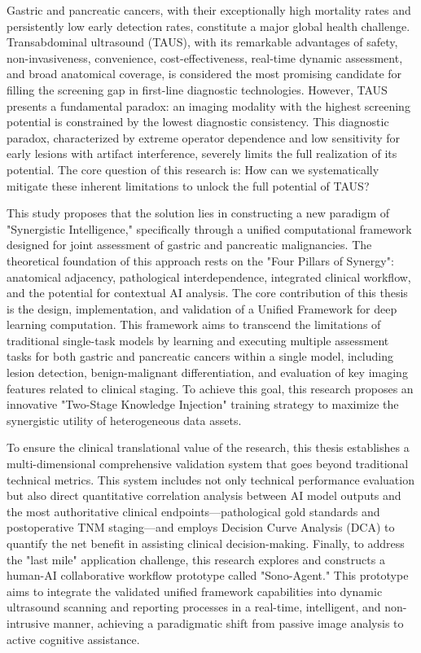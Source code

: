 
Gastric and pancreatic cancers, with their exceptionally high mortality rates and persistently low early detection rates, constitute a major global health challenge. Transabdominal ultrasound (TAUS), with its remarkable advantages of safety, non-invasiveness, convenience, cost-effectiveness, real-time dynamic assessment, and broad anatomical coverage, is considered the most promising candidate for filling the screening gap in first-line diagnostic technologies. However, TAUS presents a fundamental paradox: an imaging modality with the highest screening potential is constrained by the lowest diagnostic consistency. This diagnostic paradox, characterized by extreme operator dependence and low sensitivity for early lesions with artifact interference, severely limits the full realization of its potential. The core question of this research is: How can we systematically mitigate these inherent limitations to unlock the full potential of TAUS?

This study proposes that the solution lies in constructing a new paradigm of "Synergistic Intelligence," specifically through a unified computational framework designed for joint assessment of gastric and pancreatic malignancies. The theoretical foundation of this approach rests on the "Four Pillars of Synergy": anatomical adjacency, pathological interdependence, integrated clinical workflow, and the potential for contextual AI analysis. The core contribution of this thesis is the design, implementation, and validation of a Unified Framework for deep learning computation. This framework aims to transcend the limitations of traditional single-task models by learning and executing multiple assessment tasks for both gastric and pancreatic cancers within a single model, including lesion detection, benign-malignant differentiation, and evaluation of key imaging features related to clinical staging. To achieve this goal, this research proposes an innovative "Two-Stage Knowledge Injection" training strategy to maximize the synergistic utility of heterogeneous data assets.

To ensure the clinical translational value of the research, this thesis establishes a multi-dimensional comprehensive validation system that goes beyond traditional technical metrics. This system includes not only technical performance evaluation but also direct quantitative correlation analysis between AI model outputs and the most authoritative clinical endpoints—pathological gold standards and postoperative TNM staging—and employs Decision Curve Analysis (DCA) to quantify the net benefit in assisting clinical decision-making. Finally, to address the "last mile" application challenge, this research explores and constructs a human-AI collaborative workflow prototype called "Sono-Agent." This prototype aims to integrate the validated unified framework capabilities into dynamic ultrasound scanning and reporting processes in a real-time, intelligent, and non-intrusive manner, achieving a paradigmatic shift from passive image analysis to active cognitive assistance.

